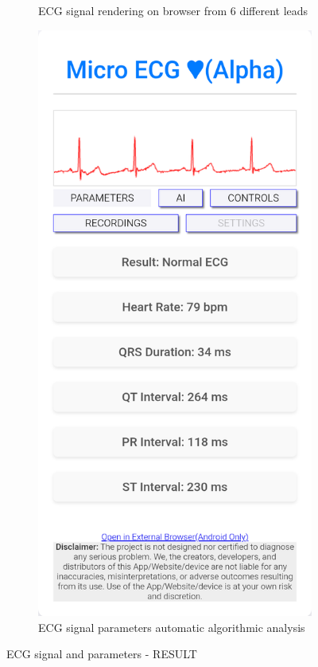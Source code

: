 \begin{figure}[h]
\begin{subfigure}[b]{0.45\textwidth}
        \caption{ECG signal rendering on browser from 6 different leads}
    \end{subfigure}
    \hfill
    \begin{subfigure}[b]{0.45\textwidth}
        \includegraphics[width=\textwidth]{images/result-params.png}
        \caption{ECG signal parameters automatic algorithmic analysis}
    \end{subfigure}
    \caption{ECG signal and parameters - RESULT}
\end{figure}
